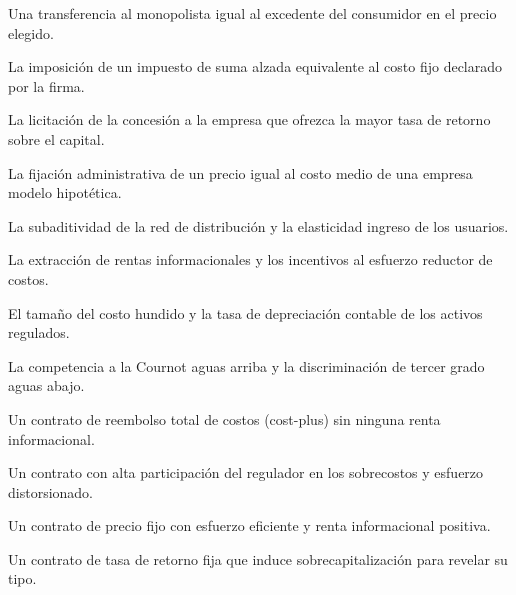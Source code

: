 \begin{opts}
    \item Una transferencia al monopolista igual al excedente del consumidor en el precio elegido.
    \item La imposición de un impuesto de suma alzada equivalente al costo fijo declarado por la firma.
    \item La licitación de la concesión a la empresa que ofrezca la mayor tasa de retorno sobre el capital.
    \item La fijación administrativa de un precio igual al costo medio de una empresa modelo hipotética.
\end{opts}

\begin{opts}
    \item La subaditividad de la red de distribución y la elasticidad ingreso de los usuarios.
    \item La extracción de rentas informacionales y los incentivos al esfuerzo reductor de costos.
    \item El tamaño del costo hundido y la tasa de depreciación contable de los activos regulados.
    \item La competencia a la Cournot aguas arriba y la discriminación de tercer grado aguas abajo.
\end{opts}

\begin{opts}
    \item Un contrato de reembolso total de costos (cost-plus) sin ninguna renta informacional.
    \item Un contrato con alta participación del regulador en los sobrecostos y esfuerzo distorsionado.
    \item Un contrato de precio fijo con esfuerzo eficiente y renta informacional positiva.
    \item Un contrato de tasa de retorno fija que induce sobrecapitalización para revelar su tipo.
\end{opts}

